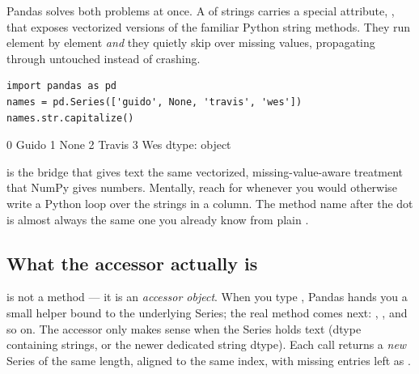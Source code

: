 \documentclass[11pt]{article}
\begin{document}
Pandas solves both problems at once. A  of strings carries a special attribute, , that exposes vectorized versions of the familiar Python string methods. They run element by element \emph{and} they quietly skip over missing values, propagating  through untouched instead of crashing.

\begin{lstlisting}
import pandas as pd
names = pd.Series(['guido', None, 'travis', 'wes'])
names.str.capitalize()
\end{lstlisting}

\begin{outblock}
0     Guido
1      None
2    Travis
3       Wes
dtype: object
\end{outblock}

\begin{keyidea}
 is the bridge that gives text the same vectorized, missing-value-aware treatment that NumPy gives numbers. Mentally, reach for  whenever you would otherwise write a Python loop over the strings in a column. The method name after the dot is almost always the same one you already know from plain .
\end{keyidea}

\subsection{What the accessor actually is}

 is not a method --- it is an \emph{accessor object}. When you type , Pandas hands you a small helper bound to the underlying Series; the real method comes next: , , and so on. The accessor only makes sense when the Series holds text (dtype  containing strings, or the newer dedicated string dtype). Each call returns a \emph{new} Series of the same length, aligned to the same index, with missing entries left as .
\end{document}
